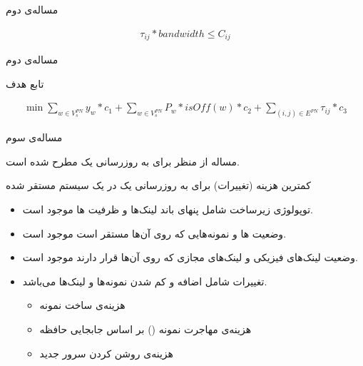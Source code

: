 \documentclass{beamer}
\makeatletter
\newcommand{\RTList}{\raggedleft\rightskip\@totalleftmargin}
\makeatother
\begin{document}
\begin{persian}
\begin{frame}{مساله‌ی دوم}
\begin{latin}
\begin{align}
		\tau_{ij} * bandwidth \le C_{ij}
	\end{align}\end{latin}
\end{frame}
\begin{frame}{مساله‌ی دوم}
	\par
	تابع هدف
	\begin{latin}\begin{align}
		\min \sum_{w \in V_{s}^{PN}} y_w * c_1 + \sum_{w \in V_{s}^{PN}} P_w * isOff(w) * c_2 + \sum_{(i,j) \in E^{PN}} \tau_{ij} * c_3
	\end{align}\end{latin}
\end{frame}
\begin{frame}{مساله‌ی سوم}
	\par
	مساله از منظر  برای به روزرسانی یک 
	مطرح شده است.
\end{frame}
\begin{frame}
	\par
	کمترین هزینه (تغییرات) برای به روزرسانی یک 
	در یک سیستم مستقر شده
\end{frame}
\begin{frame}
	\begin{itemize}\RTList{}
		\item توپولوژی زیرساخت شامل پنهای باند لینک‌ها و ظرفیت ها موجود است.
		\item وضعیت ها و نمونه‌هایی که روی آن‌ها مستقر است موجود است.
		\item وضعیت لینک‌های فیزیکی و لینک‌های مجازی که روی آن‌ها قرار دارند موجود است.
		\item تغییرات شامل اضافه و کم شدن نمونه‌ها و لینک‌ها می‌باشد.
		\begin{itemize}\RTList{}
			\item هزینه‌ی ساخت نمونه
			\item هزینه‌ی مهاجرت نمونه () بر اساس جابجایی حافظه
			\item هزینه‌ی روشن کردن سرور جدید
		\end{itemize}
	\end{itemize}
\end{frame}
\end{persian}
\end{document}
